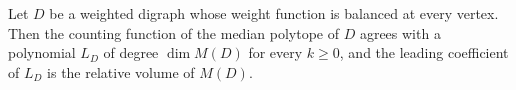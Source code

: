 \begin{theorem}\label{Bellamy19-thm-3.2}
Let $D$ be a weighted digraph whose weight function is balanced at every vertex. Then the counting function of the median polytope of $D$ agrees with a polynomial $L_{D}$ of degree $\dim M(D)$ for every $k \geq 0$, and the leading coefficient of $L_{D}$ is the relative volume of $M(D)$.
\end{theorem}
